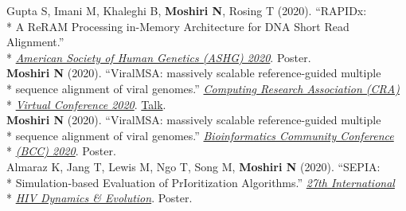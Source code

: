 \documentclass[margin,line]{res}
\begin{document}
\begin{resume}
\hspace*{4mm} Gupta S, Imani M, Khaleghi B, \textbf{Moshiri N}, Rosing T (2020). ``RAPIDx:\\*
\hspace*{9mm} A ReRAM Processing in-Memory Architecture for DNA Short Read Alignment.''\\*\vspace{2mm}
\hspace*{7mm} \href{https://www.ashg.org/meetings/2020meeting}{\textit{American Society of Human Genetics (ASHG) 2020}}. Poster.\\
\hspace*{4mm} \textbf{Moshiri N} (2020). ``ViralMSA: massively scalable reference-guided multiple\\*
\hspace*{9mm} sequence alignment of viral genomes.'' \href{https://cra.org/events/cra-virtual-conference-2020/}{\textit{Computing Research Association (CRA)}}\\*\vspace{2mm}
\hspace*{8mm} \href{https://cra.org/events/cra-virtual-conference-2020/}{\textit{Virtual Conference 2020}}. \href{https://www.youtube.com/watch?v=PrAoks7OhE8&list=PL6AeXx75lHyyqKgfRmlSM4QUEna0dWDza&index=9&t=0s}{Talk}.\\
\hspace*{4mm} \textbf{Moshiri N} (2020). ``ViralMSA: massively scalable reference-guided multiple\\*
\hspace*{9mm} sequence alignment of viral genomes.'' \href{https://bcc2020.github.io/}{\textit{Bioinformatics Community Conference}}\\*\vspace{2mm}
\hspace*{8mm} \href{https://bcc2020.github.io/}{\textit{(BCC) 2020}}. Poster.\\
\hspace*{4mm} Almaraz K, Jang T, Lewis M, Ngo T, Song M, \textbf{Moshiri N} (2020). ``SEPIA:\\*
\hspace*{9mm} Simulation-based Evaluation of PrIoritization Algorithms.'' \href{https://cme.ucsd.edu/hivdynamics/}{\textit{27th International}}\\*\vspace{2mm}
\hspace*{8mm} \href{https://cme.ucsd.edu/hivdynamics/}{\textit{HIV Dynamics \& Evolution}}. Poster.\\

\end{resume}
\end{document}
